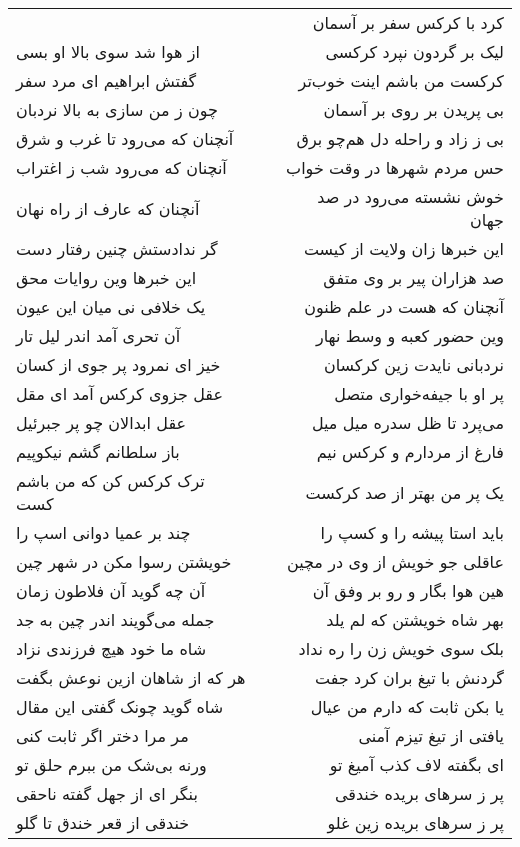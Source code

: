 \begin{center}
\begin{longtable}{l p{0.5cm} r}
&&
کرد با کرکس سفر بر آسمان
\\
از هوا شد سوی بالا او بسی
&&
لیک بر گردون نپرد کرکسی
\\
گفتش ابراهیم ای مرد سفر
&&
کرکست من باشم اینت خوب‌تر
\\
چون ز من سازی به بالا نردبان
&&
بی پریدن بر روی بر آسمان
\\
آنچنان که می‌رود تا غرب و شرق
&&
بی ز زاد و راحله دل هم‌چو برق
\\
آنچنان که می‌رود شب ز اغتراب
&&
حس مردم شهرها در وقت خواب
\\
آنچنان که عارف از راه نهان
&&
خوش نشسته می‌رود در صد جهان
\\
گر ندادستش چنین رفتار دست
&&
این خبرها زان ولایت از کیست
\\
این خبرها وین روایات محق
&&
صد هزاران پیر بر وی متفق
\\
یک خلافی نی میان این عیون
&&
آنچنان که هست در علم ظنون
\\
آن تحری آمد اندر لیل تار
&&
وین حضور کعبه و وسط نهار
\\
خیز ای نمرود پر جوی از کسان
&&
نردبانی نایدت زین کرکسان
\\
عقل جزوی کرکس آمد ای مقل
&&
پر او با جیفه‌خواری متصل
\\
عقل ابدالان چو پر جبرئیل
&&
می‌پرد تا ظل سدره میل میل
\\
باز سلطانم گشم نیکوپیم
&&
فارغ از مردارم و کرکس نیم
\\
ترک کرکس کن که من باشم کست
&&
یک پر من بهتر از صد کرکست
\\
چند بر عمیا دوانی اسپ را
&&
باید استا پیشه را و کسپ را
\\
خویشتن رسوا مکن در شهر چین
&&
عاقلی جو خویش از وی در مچین
\\
آن چه گوید آن فلاطون زمان
&&
هین هوا بگار و رو بر وفق آن
\\
جمله می‌گویند اندر چین به جد
&&
بهر شاه خویشتن که لم یلد
\\
شاه ما خود هیچ فرزندی نزاد
&&
بلک سوی خویش زن را ره نداد
\\
هر که از شاهان ازین نوعش بگفت
&&
گردنش با تیغ بران کرد جفت
\\
شاه گوید چونک گفتی این مقال
&&
یا بکن ثابت که دارم من عیال
\\
مر مرا دختر اگر ثابت کنی
&&
یافتی از تیغ تیزم آمنی
\\
ورنه بی‌شک من ببرم حلق تو
&&
ای بگفته لاف کذب آمیغ تو
\\
بنگر ای از جهل گفته ناحقی
&&
پر ز سرهای بریده خندقی
\\
خندقی از قعر خندق تا گلو
&&
پر ز سرهای بریده زین غلو
\\

\end{longtable}
\end{center}
